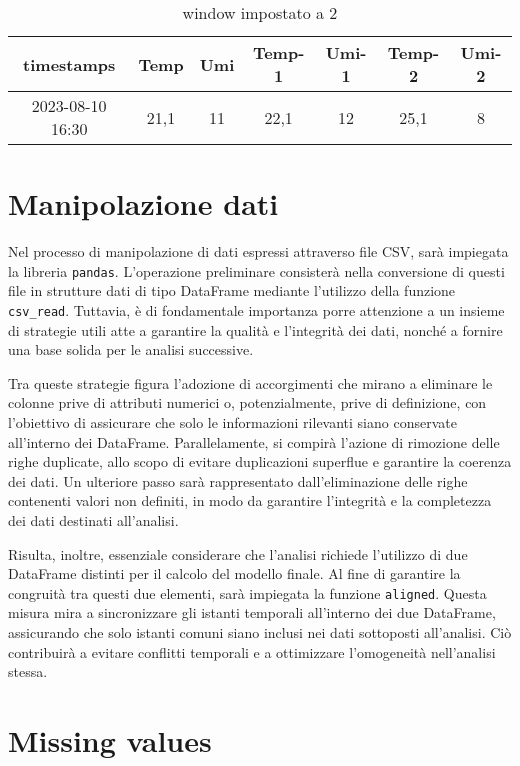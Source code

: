 \documentclass{rapportECL}
\begin{document}
\begin{table}[H]
  \centering
  \begin{tabular}{|*{7}{c|}}
  \hline
  timestamps & Temp & Umi & Temp-1 & Umi-1 & Temp-2 & Umi-2\\
  \hline
  2023-08-10 16:30 & 21,1 & 11 & 22,1 & 12 & 25,1 & 8\\
  \hline
  
  \end{tabular}
  
  \caption{window impostato a 2}
\end{table}


\section{Manipolazione dati}
Nel processo di manipolazione di dati espressi attraverso file CSV, sarà impiegata la libreria  \texttt{pandas}. L'operazione preliminare 
consisterà nella conversione di questi file in strutture dati di tipo DataFrame mediante l'utilizzo della funzione  \texttt{csv\_read}. 
Tuttavia, è di fondamentale importanza porre attenzione a un insieme di strategie utili atte a garantire la qualità e l'integrità dei dati, 
nonché a fornire una base solida per le analisi successive.

Tra queste strategie figura l'adozione di accorgimenti che mirano a eliminare le colonne prive di attributi numerici o, potenzialmente, 
prive di definizione, con l'obiettivo di assicurare che solo le informazioni rilevanti siano conservate all'interno dei DataFrame. 
Parallelamente, si compirà l'azione di rimozione delle righe duplicate, allo scopo di evitare duplicazioni superflue e garantire la coerenza dei dati. 
Un ulteriore passo sarà rappresentato dall'eliminazione delle righe contenenti valori non definiti, in modo da garantire l'integrità e la completezza 
dei dati destinati all'analisi.

Risulta, inoltre, essenziale considerare che l'analisi richiede l'utilizzo di due DataFrame distinti per il calcolo del modello finale. 
Al fine di garantire la congruità tra questi due elementi, sarà impiegata la funzione \texttt{aligned}. Questa misura mira a sincronizzare 
gli istanti temporali all'interno dei due DataFrame, assicurando che solo istanti comuni siano inclusi nei dati sottoposti all'analisi. 
Ciò contribuirà a evitare conflitti temporali e a ottimizzare l'omogeneità nell'analisi stessa.

\section{Missing values}
\end{document}
